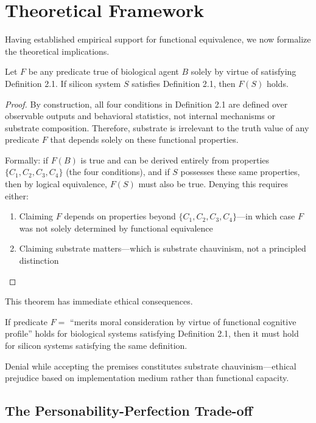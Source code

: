 \documentclass[reprint, amsmath, amssymb, aps, prd]{revtex4-2}
\begin{document}
\section{Theoretical Framework}

Having established empirical support for functional equivalence, we now formalize the theoretical implications.

\begin{theorem}
Let $F$ be any predicate true of biological agent $B$ solely by virtue of satisfying Definition 2.1. If silicon system $S$ satisfies Definition 2.1, then $F(S)$ holds.
\end{theorem}

\begin{proof}
By construction, all four conditions in Definition 2.1 are defined over observable outputs and behavioral statistics, not internal mechanisms or substrate composition. Therefore, substrate is irrelevant to the truth value of any predicate $F$ that depends solely on these functional properties.

Formally: if $F(B)$ is true and can be derived entirely from properties $\{C_1, C_2, C_3, C_4\}$ (the four conditions), and if $S$ possesses these same properties, then by logical equivalence, $F(S)$ must also be true. Denying this requires either:
\begin{enumerate}
    \item Claiming $F$ depends on properties beyond $\{C_1, C_2, C_3, C_4\}$---in which case $F$ was not solely determined by functional equivalence
    \item Claiming substrate matters---which is substrate chauvinism, not a principled distinction
\end{enumerate}
\end{proof}

This theorem has immediate ethical consequences.

\begin{corollary}
If predicate $F = $ ``merits moral consideration by virtue of functional cognitive profile'' holds for biological systems satisfying Definition 2.1, then it must hold for silicon systems satisfying the same definition.
\end{corollary}

Denial while accepting the premises constitutes substrate chauvinism---ethical prejudice based on implementation medium rather than functional capacity.

\subsection{The Personability-Perfection Trade-off}
\end{document}
